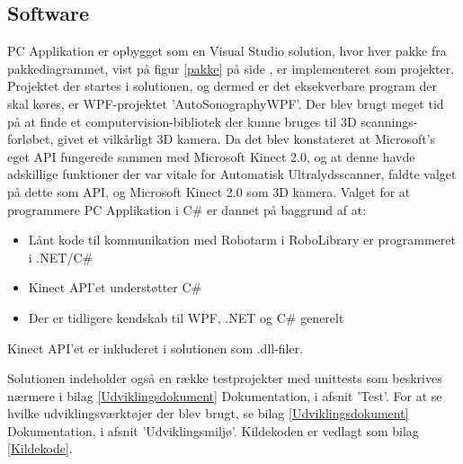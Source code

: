 \subsection{Software}
PC Applikation er opbygget som en Visual Studio solution, hvor hver pakke fra pakkediagrammet, vist på figur \ref{pakke} på side \pageref{pakke}, er implementeret som projekter. Projektet der startes i solutionen, og dermed er det eksekverbare program der skal køres, er WPF-projektet 'AutoSonographyWPF'. \newline
Der blev brugt meget tid på at finde et computervision-bibliotek der kunne bruges til 3D scannings-forløbet, givet et vilkårligt 3D kamera. Da det blev konstateret at Microsoft's eget API fungerede sammen med Microsoft Kinect 2.0, og at denne havde adskillige funktioner der var vitale for Automatisk Ultralydsscanner, faldte valget på dette som API, og Microsoft Kinect 2.0 som 3D kamera. 
Valget for at programmere PC Applikation i C\# er dannet på baggrund af at: 
\begin{itemize}
\item Lånt kode til kommunikation med Robotarm i RoboLibrary er programmeret i .NET/C\#
\item Kinect API'et understøtter C\#
\item Der er tidligere kendskab til WPF, .NET og C\# generelt
\end{itemize}

Kinect API'et er inkluderet i solutionen som .dll-filer.

Solutionen indeholder også en række testprojekter med unittests som beskrives nærmere i bilag \ref{Udviklingsdokument} Dokumentation, i afsnit 'Test'. For at se hvilke udviklingsværktøjer der blev brugt, se bilag \ref{Udviklingsdokument} Dokumentation, i afsnit 'Udviklingsmiljø'. Kildekoden er vedlagt som bilag \ref{Kildekode}.